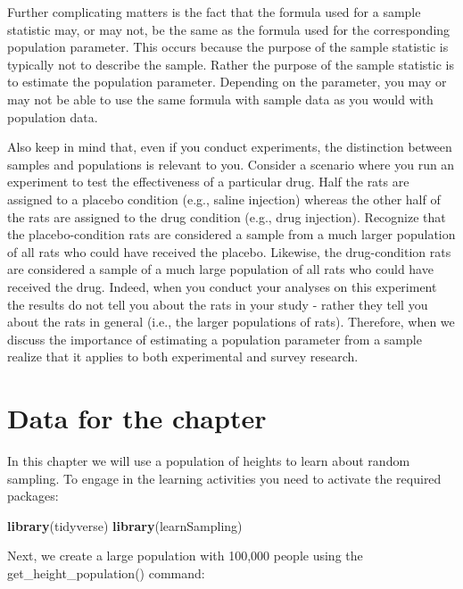 \documentclass[
]{krantz}
\makeatletter
\newenvironment{Shaded}{\begin{snugshade}}{\end{snugshade}}
\newcommand{\KeywordTok}[1]{\textcolor[rgb]{0.27,0.27,0.27}{\textbf{#1}}}
\newcommand{\NormalTok}[1]{#1}
\newenvironment{kframe}{%
\medskip{}
\setlength{\fboxsep}{.8em}
 \def\at@end@of@kframe{}%
 \ifinner\ifhmode%
  \def\at@end@of@kframe{\end{minipage}}%
  \begin{minipage}{\columnwidth}%
 \fi\fi%
 \def\FrameCommand##1{\hskip\@totalleftmargin \hskip-\fboxsep
 \colorbox{shadecolor}{##1}\hskip-\fboxsep
     \hskip-\linewidth \hskip-\@totalleftmargin \hskip\columnwidth}%
 \MakeFramed {\advance\hsize-\width
   \@totalleftmargin\z@ \linewidth\hsize
   \@setminipage}}%
 {\par\unskip\endMakeFramed%
 \at@end@of@kframe}
\renewenvironment{Shaded}{\begin{kframe}}{\end{kframe}}
\makeatother
\begin{document}
Further complicating matters is the fact that the formula used for a sample statistic may, or may not, be the same as the formula used for the corresponding population parameter. This occurs because the purpose of the sample statistic is typically not to describe the sample. Rather the purpose of the sample statistic is to estimate the population parameter. Depending on the parameter, you may or may not be able to use the same formula with sample data as you would with population data.

Also keep in mind that, even if you conduct experiments, the distinction between samples and populations is relevant to you. Consider a scenario where you run an experiment to test the effectiveness of a particular drug. Half the rats are assigned to a placebo condition (e.g., saline injection) whereas the other half of the rats are assigned to the drug condition (e.g., drug injection). Recognize that the placebo-condition rats are considered a sample from a much larger population of all rats who could have received the placebo. Likewise, the drug-condition rats are considered a sample of a much large population of all rats who could have received the drug. Indeed, when you conduct your analyses on this experiment the results do not tell you about the rats in your study - rather they tell you about the rats in general (i.e., the larger populations of rats). Therefore, when we discuss the importance of estimating a population parameter from a sample realize that it applies to both experimental and survey research.

\hypertarget{data-for-the-chapter}{%
\section{Data for the chapter}\label{data-for-the-chapter}}

In this chapter we will use a population of heights to learn about random sampling. To engage in the learning activities you need to activate the required packages:

\begin{Shaded}
\begin{Highlighting}[]
\KeywordTok{library}\NormalTok{(tidyverse)}
\KeywordTok{library}\NormalTok{(learnSampling)}
\end{Highlighting}
\end{Shaded}

Next, we create a large population with 100,000 people using the get\_height\_population() command:
\end{document}
